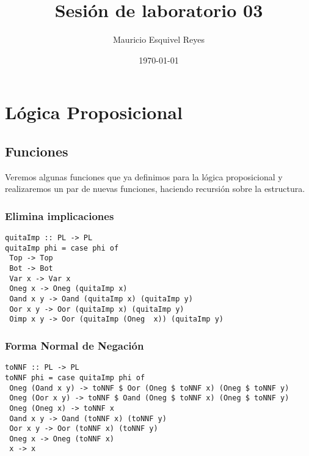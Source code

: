 \documentclass[11pt]{article}
\author{Mauricio Esquivel Reyes}
\date{\today}
\title{Sesión de laboratorio 03}
\begin{document}
\maketitle
\tableofcontents

\section{Lógica Proposicional}
\label{sec:org6c8bd7a}
\subsection{Funciones}
\label{sec:org9190209}
Veremos algunas funciones que ya definimos para la lógica proposicional y 
realizaremos un par de nuevas funciones, haciendo recursión sobre la estructura.
\subsubsection{Elimina implicaciones}
\label{sec:org4ea8142}
\begin{verbatim}
quitaImp :: PL -> PL
quitaImp phi = case phi of
 Top -> Top
 Bot -> Bot
 Var x -> Var x
 Oneg x -> Oneg (quitaImp x)
 Oand x y -> Oand (quitaImp x) (quitaImp y)
 Oor x y -> Oor (quitaImp x) (quitaImp y)
 Oimp x y -> Oor (quitaImp (Oneg  x)) (quitaImp y)
\end{verbatim}
\subsubsection{Forma Normal de Negación}
\label{sec:orgd44b7c3}
\begin{verbatim}
toNNF :: PL -> PL
toNNF phi = case quitaImp phi of
 Oneg (Oand x y) -> toNNF $ Oor (Oneg $ toNNF x) (Oneg $ toNNF y)
 Oneg (Oor x y) -> toNNF $ Oand (Oneg $ toNNF x) (Oneg $ toNNF y)
 Oneg (Oneg x) -> toNNF x
 Oand x y -> Oand (toNNF x) (toNNF y)
 Oor x y -> Oor (toNNF x) (toNNF y)
 Oneg x -> Oneg (toNNF x)
 x -> x
\end{verbatim}
\end{document}
